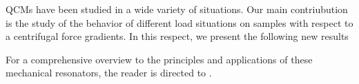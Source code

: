 QCMs have been studied in a wide variety of situations.  Our main
contriubution is the study of the behavior of different load situations on
samples with respect to a centrifugal force gradients.  In this respect, we
present the following new results


For a comprehensive overview to the principles and applications of these
mechanical resonators, the reader is directed to \cite{steinemreview}.

